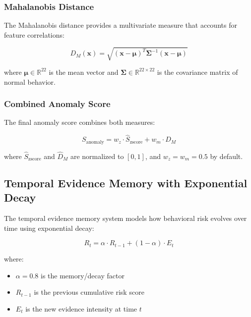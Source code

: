 \documentclass{article}
\begin{document}
\subsubsection{Mahalanobis Distance}

The Mahalanobis distance provides a multivariate measure that accounts for feature correlations:

\begin{equation}
    D_M(\mathbf{x}) = \sqrt{(\mathbf{x} - \boldsymbol{\mu})^T \boldsymbol{\Sigma}^{-1} (\mathbf{x} - \boldsymbol{\mu})}
    \label{eq:mahalanobis}
\end{equation}

where $\boldsymbol{\mu} \in \mathbb{R}^{22}$ is the mean vector and $\boldsymbol{\Sigma} \in \mathbb{R}^{22 \times 22}$ is the covariance matrix of normal behavior.

\subsubsection{Combined Anomaly Score}

The final anomaly score combines both measures:

\begin{equation}
    S_{\text{anomaly}} = w_z \cdot \hat{S}_{\text{zscore}} + w_m \cdot \hat{D}_M
    \label{eq:combined_anomaly}
\end{equation}

where $\hat{S}_{\text{zscore}}$ and $\hat{D}_M$ are normalized to $[0, 1]$, and $w_z = w_m = 0.5$ by default.

\subsection{Temporal Evidence Memory with Exponential Decay}

The temporal evidence memory system models how behavioral risk evolves over time using exponential decay:

\begin{equation}
    R_t = \alpha \cdot R_{t-1} + (1 - \alpha) \cdot E_t
    \label{eq:risk_decay}
\end{equation}

where:
\begin{itemize}
    \item $\alpha = 0.8$ is the memory/decay factor
    \item $R_{t-1}$ is the previous cumulative risk score
    \item $E_t$ is the new evidence intensity at time $t$
\end{itemize}
\end{document}

